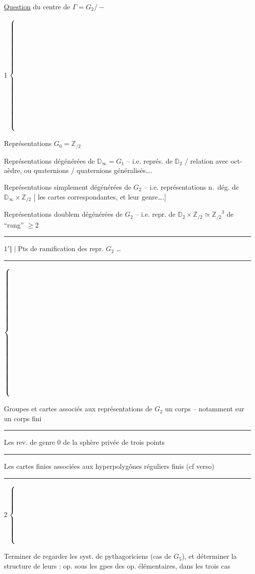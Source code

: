 \uline{Question} du centre de $\Gamma=G_2/{-}$

\noindent\textcircled{1}\(\left\{\vphantom{\rule{0pt}{30mm}}\right.\)\begin{minipage}{.88\linewidth}
Représentations   $G_0=\mathbb Z_{/2}$

Représentations  dégénérées de $\mathbb D_\infty=G_1$ -- i.e. représ.  de $\mathbb D_2$ / relation
avec oct-aèdre, ou quaternions / quaternions généralisés\ldots.

Représentations simplement dégénérées de $G_2$ -- i.e.
représentations n.\ dég. de $\mathbb D_\infty\times\mathbb Z_{/2}$ [
les cartes correspondantes, et leur genre\ldots.]

Représentations doublem dégénérées de $G_2$ -- i.e. repr.
de $\mathbb D_2\times\mathbb Z_{/2}\simeq{\mathbb Z_{/2}}^3$  de ``rang''  $\geqslant 2$
\end{minipage}

\noindent\rule{.33\linewidth}{.4pt}

\textcircled{\scriptsize $1'$}\quad$\Vert\!\mid$\quad Pts de ramification des repr.  $G_2$ \ldots

\noindent\rule{.33\linewidth}{.4pt}

\noindent\(\left\{\vphantom{\rule{0pt}{34mm}}\right.\)\begin{minipage}{.91\linewidth}
Groupes et cartes associés aux représentations 
de $G_2$  un corps -- notamment sur
un corps fini

\noindent\rule{.60\linewidth}{.4pt}

Les rev.  de genre $0$ de la
sphère privée de trois points

\noindent\rule{.60\linewidth}{.4pt}

Les cartes finies associées aux hyperpolygônes
réguliers finis (cf verso)
\end{minipage}

\noindent\rule{.37\linewidth}{.4pt}

\noindent\textcircled{2}\(\left\{\vphantom{\rule{0pt}{16mm}}\right.\)\begin{minipage}{.87\linewidth}
Terminer de regarder les syst. de  pythagoriciens
(cas de $G_5$), et déterminer
 la structure de leurs : op. sous les
gpes des op. élémentaires, dans les trois cas
\end{minipage}

